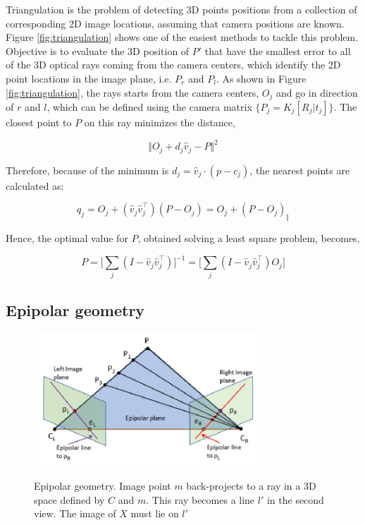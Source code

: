 Triangulation is the problem of detecting 3D points positions from a collection of corresponding 2D image locations, assuming that camera positions are known.
Figure \ref{fig:triangulation} shows one of the easiest methods to tackle this problem. 
Objective is to evaluate the 3D position of $P'$ that have the smallest error to all of the 3D optical rays coming from the camera centers, which identify the 2D point locations in the image plane, i.e. $P_r$ and $P_l$.
As shown in Figure \ref{fig:triangulation}, the rays starts from the camera centers, $O_j$ and go in direction of $r$ and $l$, which can be defined using the camera matrix $ \{ P_j = K_j [ R_j | t_j ] \} $.
The closest point to $P$ on this ray minimizes the distance,

\begin{equation}
\label{eqn:mindist}
	\Vert O_j + d_j \hat{v}_j - P \Vert^2
\end{equation}

Therefore, because of the minimum is $d_j = \hat{v}_j \cdot (p - c_j)$, the nearest points are calculated as:

\begin{equation}\label{eqn:closestpoint}
	q_j = O_j + (\hat{v}_j \hat{v}_j^\top)(P - O_j) = O_j + (P - O_j)_{\Vert}
\end{equation}

Hence, the optimal value for $P$, obtained solving a least square problem, becomes,

\begin{equation}\label{eqn:solP}
	P = \Big[ \sum_j (I - \hat{v}_j \hat{v}_j^\top ) \Big]^{-1} = \Big[ \sum_j (I - \hat{v}_j \hat{v}_j^\top )O_j \Big]
\end{equation}

\subsection{Epipolar geometry}
\label{subsec:epipolargeom}

\begin{figure}[t]
	\begin{center}
		{\includegraphics[width=.8\textwidth, height=5cm, keepaspectratio]{images/epipolar-geometry-2}}
\caption{Epipolar geometry. Image point $m$ back-projects to a ray in a 3D space defined by $C$ and $m$. This ray becomes a line $l'$ in the second view. The image of $X$ must lie on $l'$}
\label{fig:epipolargeom-2}
	\end{center}
\end{figure}

